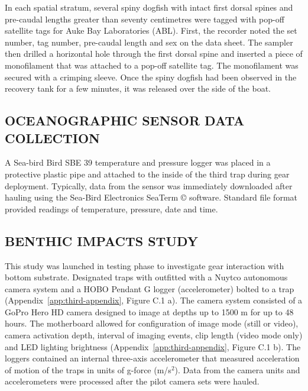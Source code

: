 \documentclass[12pt]{article}\usepackage[]{graphicx}\usepackage[]{color}
\begin{document}
In each spatial stratum, several spiny dogfish with intact first dorsal spines and pre-caudal lengths greater than seventy centimetres were tagged with pop-off satellite tags for Auke Bay Laboratories (ABL). First, the recorder noted the set number, tag number, pre-caudal length and sex on the data sheet. The sampler then drilled a horizontal hole through the first dorsal spine and inserted a piece of monofilament that was attached to a pop-off satellite tag. The monofilament was secured with a crimping sleeve. Once the spiny dogfish had been observed in the recovery tank for a few minutes, it was released over the side of the boat.

\hypertarget{oceanographic-sensor-data-collection}{%
\subsection{OCEANOGRAPHIC SENSOR DATA COLLECTION}\label{oceanographic-sensor-data-collection}}

A Sea-bird Bird SBE 39 temperature and pressure logger was placed in a protective plastic pipe and attached to the inside of the third trap during gear deployment. Typically, data from the sensor was immediately downloaded after hauling using the Sea-Bird Electronics SeaTerm © software. Standard file format provided readings of temperature, pressure, date and time.

\hypertarget{benthic-impacts-study-1}{%
\subsection{BENTHIC IMPACTS STUDY}\label{benthic-impacts-study-1}}

This study was launched in testing phase to investigate gear interaction with bottom substrate. Designated traps with outfitted with a Nuytco autonomous camera system and a HOBO Pendant G logger (accelerometer) bolted to a trap (Appendix~\ref{app:third-appendix}, Figure C.1 a). The camera system consisted of a GoPro Hero HD camera designed to image at depths up to 1500 m for up to 48 hours. The motherboard allowed for configuration of image mode (still or video), camera activation depth, interval of imaging events, clip length (video mode only) and LED lighting brightness (Appendix~\ref{app:third-appendix}, Figure C.1 b). The loggers contained an internal three-axis accelerometer that measured acceleration of motion of the traps in units of g-force (m/s\(^2\)). Data from the camera units and accelerometers were processed after the pilot camera sets were hauled.
\end{document}
